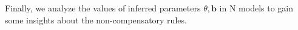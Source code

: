 \documentclass[letterpaper]{article} %
\newcommand{\Rating}{\mathbf{X}}
\begin{document}
Finally, we analyze the values of inferred parameters $\theta,\mathbf{b}$ in N models to gain some insights about the non-compensatory rules. 
%
\end{document}
